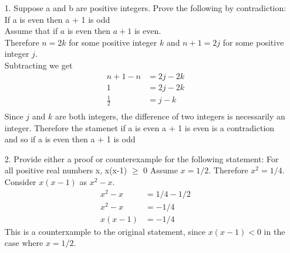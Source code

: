 \documentclass[a4paper,12pt]{article}
\begin{document}
    \begin{itemize}
      \item[1.] Suppose a and b are positive integers. Prove the following by contradiction: If a is even then a + 1 is odd
      \\
      Assume that if $a$ is even then $a + 1$ is even.
      \\
      Therefore $n=2k$ for some positive integer $k$ and $n+1=2j$ for some positive integer $j$.
      \\
      Subtracting we get
      \begin{align*}
        n + 1 - n &= 2j - 2k \\
        1 &= 2j - 2k\\
        \frac{1}{2}&=j - k\\ 
      \end{align*}
      Since $j$ and $k$ are both integers, the difference of two integers is necessarily an integer. Therefore the stamenet if a is even a + 1 is even is a contradiction and so if a is even then a + 1 is odd
      \item[2.] Provide either a proof or counterexample for the following statement: For all positive real numbers x, x(x-1) $\geq$ 0
      Assume $x=1/2$. Therefore $x^2=1/4$. Consider $x(x-1)$ as $x^2 - x$.
      \begin{align*}
        x^2 - x &= 1/4 - 1/2 \\
        x^2 - x &= - 1/4\\
        x(x-1) &= -1/4
      \end{align*}
      This is a counterxample to the original statement, since $x(x-1) < 0$ in the case where $x=1/2$.
    \end{itemize} 
\end{document}
